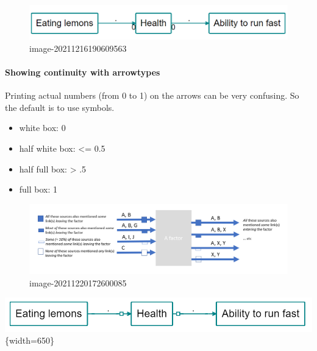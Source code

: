 \documentclass[
]{book}
\providecommand{\tightlist}{%
  \setlength{\itemsep}{0pt}\setlength{\parskip}{0pt}}
\begin{document}
\begin{figure}
\centering
\includegraphics[width=6.77083in,height=\textheight]{_assets/image-20211216190609563.png}
\caption{image-20211216190609563}
\end{figure}

\hypertarget{showing-continuity-with-arrowtypes-1}{%
\paragraph{Showing continuity with arrowtypes}\label{showing-continuity-with-arrowtypes-1}}

Printing actual numbers (from 0 to 1) on the arrows can be very confusing. So the default is to use symbols.

\begin{itemize}
\tightlist
\item
  white box: 0
\item
  half white box: \textless= 0.5
\item
  half full box: \textgreater{} .5
\item
  full box: 1
\end{itemize}

\begin{figure}
\centering
\includegraphics[width=6.77083in,height=\textheight]{_assets/image-20211220172600085.png}
\caption{image-20211220172600085}
\end{figure}

\includegraphics[width=6.77083in,height=\textheight]{_assets/image-20211220171759409.png}\{width=650\}
\end{document}

